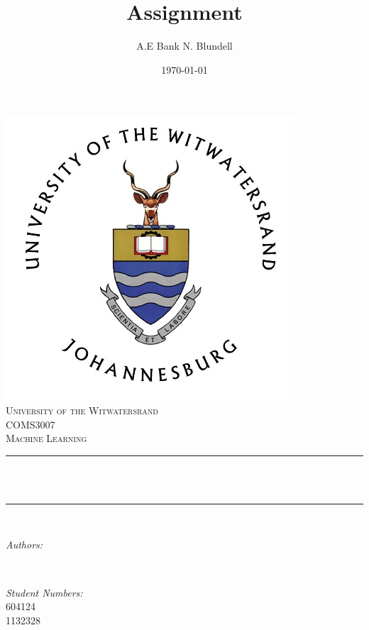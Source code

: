 \documentclass[12pt]{book}
\title{Assignment}								%
\author{A.E Bank \newline N. Blundell}
\date{\today}											%
\makeatletter
\let\thetitle\@title
\let\theauthor\@author
\let\thedate\@date
\makeatother
\begin{document}

\begin{titlepage}
	\centering
    \vspace*{0.5 cm}
    \includegraphics[scale = 0.75]{wits-logo.jpg}\\[1.0 cm]	%
    \textsc{\LARGE University of the Witwatersrand}\\[2.0 cm]	%
	\textsc{\Large COMS3007}\\[0.5 cm]				%
	\textsc{\large Machine Learning}\\[0.5 cm]				%
	\rule{\linewidth}{0.2 mm} \\[0.4 cm]
	{ \huge \bfseries \thetitle}\\
	\rule{\linewidth}{0.2 mm} \\[1.5 cm]

	\begin{minipage}{0.4\textwidth}
		\begin{flushleft} \large
			\emph{Authors:}\\
			\theauthor
			\end{flushleft}
			\end{minipage}~
			\begin{minipage}{0.4\textwidth}
			\begin{flushright} \large
			\emph{Student Numbers:} \\
				604124 \\
				1132328									%
		\end{flushright}
	\end{minipage}\\[2 cm]

	{\large \thedate}\\[2 cm]

	\vfill

\end{titlepage}
\end{document}
